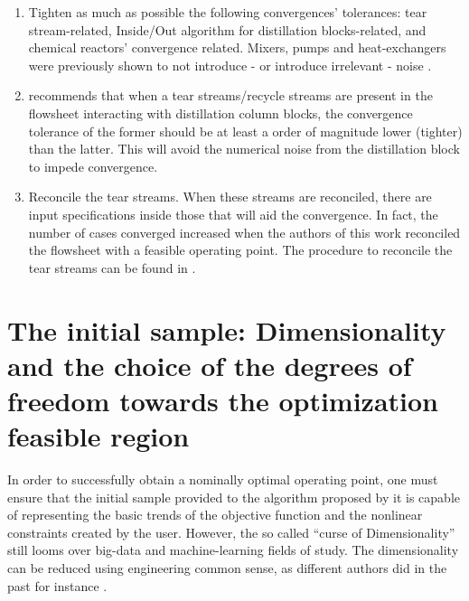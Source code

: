 \documentclass[../msc-thesis.tex]{subfiles}
\begin{document}
\begin{enumerate}
    \item Tighten as much as possible the following convergences' tolerances: 
    tear stream-related, Inside/Out algorithm for distillation blocks-related, 
    and chemical reactors' convergence related. Mixers, pumps and heat-exchangers 
    were previously shown to not introduce - or introduce irrelevant - noise 
    \cite{Quirante2016}.

    \item \textcite{Aspentech2017} recommends that when a tear streams/recycle 
    streams are present in the flowsheet interacting with distillation column 
    blocks, the convergence tolerance of the former should be at least a 
    order of magnitude lower (tighter) than the latter. This will avoid the 
    numerical noise from the distillation block to impede convergence.

    \item Reconcile the tear streams. When these streams are reconciled, 
    there are input specifications inside those that will aid the convergence. 
    In fact, the number of cases converged increased when the authors of this 
    work reconciled the flowsheet with a feasible operating point. The 
    procedure to reconcile the tear streams can be found in 
    \textcite{Aspentech2017}.

\end{enumerate}

\section{The initial sample: Dimensionality and the choice of the degrees of 
freedom towards the optimization feasible region} \label{subsection:point2}

In order to successfully obtain a nominally optimal operating point, one must 
ensure that the initial sample provided to the algorithm proposed by 
\textcite{Caballero2008} it is capable of representing the basic trends of the 
objective function and the nonlinear constraints created by the user. However, 
the so called ``curse of Dimensionality'' \textcite{Forrester2008} still looms 
over big-data and machine-learning fields of study. The dimensionality can 
be reduced using engineering common sense, as different authors did in the 
past for instance \cite{Araujo2007,Araujo2008,Gera2013}. 
\end{document}
